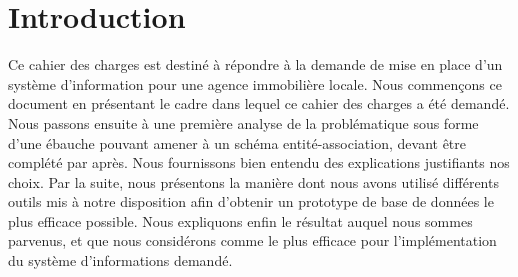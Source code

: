 \section{Introduction}
Ce cahier des charges est destiné à répondre à la demande de mise en place d'un système d'information pour une agence immobilière locale. Nous commençons ce document en présentant le cadre dans lequel ce cahier des charges a été demandé. Nous passons ensuite à une première analyse de la problématique sous forme d'une ébauche pouvant amener à un schéma entité-association, devant être complété par après. Nous fournissons bien entendu des explications justifiants nos choix. Par la suite, nous présentons la manière dont nous avons utilisé différents outils mis à notre disposition afin d'obtenir un prototype de base de données le plus efficace possible. Nous expliquons enfin le résultat auquel nous sommes parvenus, et que nous considérons comme le plus efficace pour l'implémentation du système d'informations demandé.